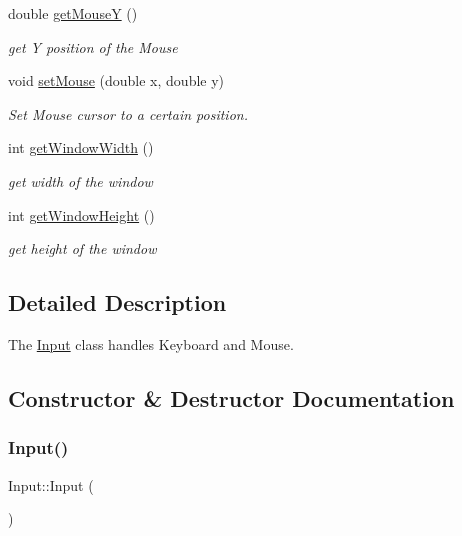\begin{DoxyCompactItemize}
double \hyperlink{class_input_afdb964d8fffbbc6bab1d3b34648c1543}{get\+MouseY} ()
\begin{DoxyCompactList}\small\item\em get Y position of the Mouse \end{DoxyCompactList}\item 
void \hyperlink{class_input_a2c477753baedd21924670f0a16260160}{set\+Mouse} (double x, double y)
\begin{DoxyCompactList}\small\item\em Set Mouse cursor to a certain position. \end{DoxyCompactList}\item 
int \hyperlink{class_input_a8e4f99acfe8cadda2879697be26bf295}{get\+Window\+Width} ()
\begin{DoxyCompactList}\small\item\em get width of the window \end{DoxyCompactList}\item 
int \hyperlink{class_input_a3eccc8d5cd466b7ec312e3af7b801473}{get\+Window\+Height} ()
\begin{DoxyCompactList}\small\item\em get height of the window \end{DoxyCompactList}\end{DoxyCompactItemize}


\subsection{Detailed Description}
The \hyperlink{class_input}{Input} class handles Keyboard and Mouse. 

\subsection{Constructor \& Destructor Documentation}
\mbox{\label{class_input_abae3f379d3f157cf42dc857309832dba}} 
\subsubsection{\texorpdfstring{Input()}{Input()}}
{\footnotesize\ttfamily Input\+::\+Input (\begin{DoxyParamCaption}{ }\end{DoxyParamCaption})}



